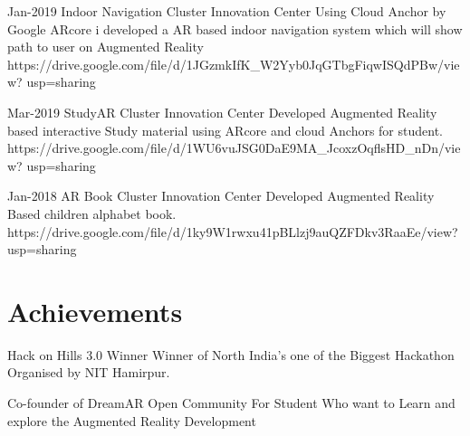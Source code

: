 \documentclass[]{cv-style}          %
\begin{document}
\begin{entrylist}
\entry
{Jan-2019}
{Indoor Navigation}
{Cluster Innovation Center}
{Using Cloud Anchor by Google ARcore i developed a AR based indoor navigation system which will show path to user on Augmented Reality \newline
https://drive.google.com/file/d/1JGzmkIfK\_W2Yyb0JqGTbgFiqwISQdPBw/view?
usp=sharing}
{\vspace{-0.3cm}}
\end{entrylist}
\begin{entrylist}
\entry
{Mar-2019}
{StudyAR}
{Cluster Innovation Center}
{Developed Augmented Reality based interactive Study material using ARcore and cloud Anchors for student. \newline https://drive.google.com/file/d/1WU6vuJSG0DaE9MA\_JcoxzOqflsHD\_nDn/view?
usp=sharing }
{\vspace{-0.3cm}}


\end{entrylist}
\begin{entrylist}
\entry
{Jan-2018}
{AR Book}
{Cluster Innovation Center}
{Developed Augmented Reality Based children alphabet book. \newline https://drive.google.com/file/d/1ky9W1rwxu41pBLlzj9auQZFDkv3RaaEe/view?
usp=sharing }
{\vspace{-0.3cm}}


\end{entrylist}
\pagebreak

\section{Achievements}

\begin{entrylist}
\entry
{}
{Hack on Hills 3.0 Winner }
{\newline Winner of North India's one of the Biggest Hackathon Organised by NIT Hamirpur. }
{}

\end{entrylist}
\begin{entrylist}
\entry
{}
{Co-founder of DreamAR}
{\newline Open Community For Student Who want to Learn and explore the Augmented Reality Development}
{}

\end{entrylist}
\end{document}
